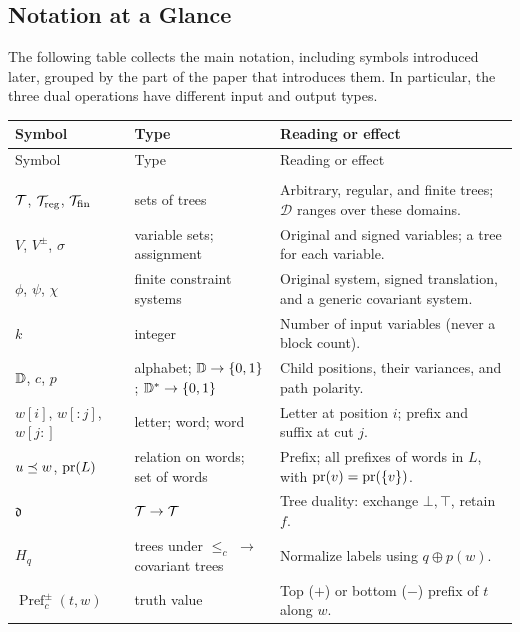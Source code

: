 

\FloatBarrier
\subsection{Notation at a Glance}\label{sec:notation}
The following table collects the main notation, including symbols
introduced later, grouped by the part of the paper that introduces them.
In particular, the three dual operations have different input and output
types.
\begingroup
\small
\begin{longtable}{@{}>{\raggedright\arraybackslash}p{.21\linewidth}>{\raggedright\arraybackslash}p{.28\linewidth}>{\raggedright\arraybackslash}p{.44\linewidth}@{}}
\toprule
Symbol & Type & Reading or effect\\
\midrule
\endfirsthead
\toprule
Symbol & Type & Reading or effect\\
\midrule
\endhead
\bottomrule
\endfoot
\multicolumn{3}{@{}l}{\emph{Semantics and constraints (\cref{sec:background,sec:variance,sec:spines})}}\\
$\mathcal{T}$, $\mathcal{T}_{\mathrm{reg}}$, $\mathcal{T}_{\mathrm{fin}}$ & sets of trees & Arbitrary, regular, and finite trees; $\mathcal D$ ranges over these domains.\\
$V$, $V^\pm$, $\sigma$ & variable sets; assignment & Original and signed variables; a tree for each variable.\\
$\phi$, $\psi$, $\chi$ & finite constraint systems & Original system, signed translation, and a generic covariant system.\\
$k$ & integer & Number of input variables (never a block count).\\
$\mathbb{D}$, $c$, $p$ & alphabet; $\mathbb{D}\to\{0,1\}$; $\mathbb{D}^*\to\{0,1\}$ & Child positions, their variances, and path polarity.\\
$w[i]$, $w[:j]$, $w[j:]$ & letter; word; word & Letter at position $i$; prefix and suffix at cut $j$.\\
$u\preceq w$, $\operatorname{pr}(L)$ & relation on words; set of words & Prefix; all prefixes of words in $L$, with $\operatorname{pr}(v)=\operatorname{pr}(\{v\})$.\\
$\mathfrak d$ & $\mathcal{T}\to\mathcal{T}$ & Tree duality: exchange $\bot,\top$, retain $f$.\\
$H_q$ & trees under $\le_c$ $\to$ covariant trees & Normalize labels using $q\oplus p(w)$.\\
$\operatorname{Pref}^\pm_c(t,w)$ & truth value & Top ($+$) or bottom ($-$) prefix of $t$ along $w$.\\

\end{longtable}
